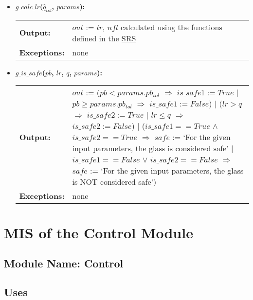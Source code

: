 \documentclass[12pt]{article}
\begin{document}
\begin{itemize}
\item\textbf{$g\_calc\_lr$($\hat{q}_{tol}$, $params$):} \\ \newline
\begin{tabular}{l p{}}
\textbf{Output:} & $out$ := $lr$, $nfl$ calculated using the functions defined in the \href{../SRS/glassbr_srs.pdf}{SRS} \\ 
\textbf{Exceptions:} & none \\ 
\end{tabular}

\item\textbf{$g\_is\_safe$($pb$, $lr$, $q$, $params$):}  \\ \newline
\begin{tabular}{l p{}}
\textbf{Output:} & $out$ := \newline
($pb < params.pb_{tol}$ $\Rightarrow$ $is\_safe1 := True$ 
$|$ $pb \geq params.pb_{tol}$ $\Rightarrow$ $is\_safe1 := False$) \newline $|$
($lr > q$ $\Rightarrow$ $is\_safe2 := True$ $|$ $lr \leq q$ $\Rightarrow$ $is\_safe2 := False$)
\newline $|$ ($is\_safe1 == True$ $\wedge$ $is\_safe2 == True$ $\Rightarrow$ $safe$ := `For
the given input parameters, the glass is considered safe' $|$ $is\_safe1 == False$ $\vee$ 
$is\_safe2 == False$ $\Rightarrow$ $safe$ := `For the given input parameters, the glass is
NOT considered safe')\\ 
\textbf{Exceptions:} & none \\
\end{tabular}
\end{itemize}


\section{MIS of the Control Module} \label{SecCtrl}

\subsection{Module Name: Control}

\subsection{Uses}
\end{document}
